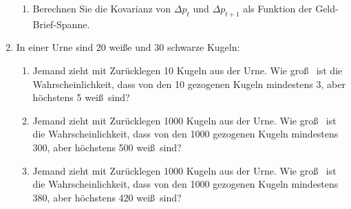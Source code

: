 \begin{enumerate}
\begin{enumerate}
\item Berechnen Sie die Kovarianz von $\Delta p_{t}$ und $\Delta p_{t+1}$
als Funktion der Geld-Brief-Spanne.
\end{enumerate}

\item In einer Urne sind 20 wei\ss e und 30 schwarze Kugeln:
\begin{enumerate}
\item Jemand zieht mit Zur\"{u}cklegen 10 Kugeln aus der Urne. Wie gro\ss\ %
ist die Wahrscheinlichkeit, dass von den 10 gezogenen Kugeln mindestens 3,
aber h\"{o}chstens 5 wei\ss\ sind?
\item Jemand zieht mit Zur\"{u}cklegen 1000 Kugeln aus der Urne. Wie gro\ss\ %
ist die Wahrscheinlichkeit, dass von den 1000 gezogenen Kugeln mindestens
300, aber h\"{o}chstens 500 wei\ss\ sind?
\item Jemand zieht mit Zur\"{u}cklegen 1000 Kugeln aus der Urne. Wie gro\ss\ %
ist die Wahrscheinlichkeit, dass von den 1000 gezogenen Kugeln mindestens
380, aber h\"{o}chstens 420 wei\ss\ sind?
\end{enumerate}
\end{enumerate}
